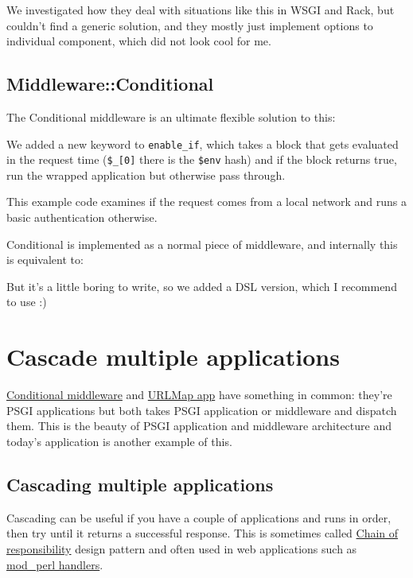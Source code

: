 We investigated how they deal with situations like this in WSGI and
Rack, but couldn't find a generic solution, and they mostly just
implement options to individual component, which did not look cool for
me.

\section{Middleware::Conditional}\label{middlewareconditional}

The Conditional middleware is an ultimate flexible solution to this:


We added a new keyword to  \lstinline!enable_if!, which
takes a block that gets evaluated in the request time (\lstinline!$_[0]!
there is the \lstinline!$env! hash) and if the block returns true, run
the wrapped application but otherwise pass through.

This example code examines if the request comes from a local network and
runs a basic authentication otherwise.

Conditional is implemented as a normal piece of middleware, and
internally this is equivalent to:


But it's a little boring to write, so we added a DSL version, which I
recommend to use :)

\chapter{Cascade multiple
applications}\label{day-19-cascade-multiple-applications}

\href{http://advent.plackperl.org/2009/12/day-18-load-middleware-conditionally.html}{Conditional
middleware} and
\href{http://advent.plackperl.org/2009/12/day-12-maps-multiple-apps-with-mount-and-urlmap.html}{URLMap
app} have something in common: they're PSGI applications but both takes
PSGI application or middleware and dispatch them. This is the beauty of
PSGI application and middleware architecture and today's application is
another example of this.

\section{Cascading multiple
applications}\label{cascading-multiple-applications}

Cascading can be useful if you have a couple of applications and runs in
order, then try until it returns a successful response. This is
sometimes called
\href{http://en.wikipedia.org/wiki/Chain-of-responsibility_pattern}{Chain
of responsibility} design pattern and often used in web applications
such as
\href{http://perl.apache.org/docs/2.0/user/handlers/intro.html}{mod\_perl
handlers}.

